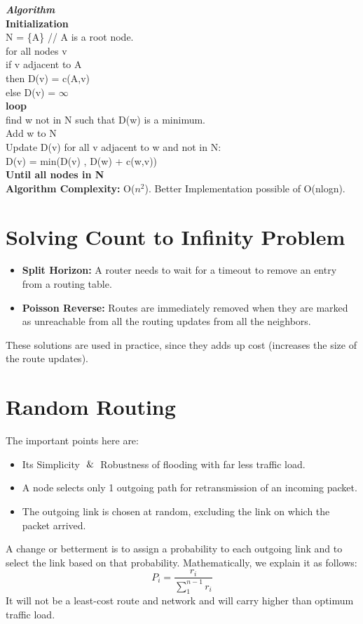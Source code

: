 \documentclass[12pt]{article}
\begin{document}
\textit{\textbf{Algorithm}} \\

\textbf{Initialization} \\
N = \{A\} // A is a root node. \\
for all nodes v \\
if v adjacent to A \\
then D(v) = c(A,v) \\
else D(v) = $\infty$ \\
\textbf{loop} \\
find w not in N such that D(w) is a minimum. \\
Add w to N \\
Update D(v) for all v adjacent to w and not in N: \\
D(v) = min(D(v) , D(w) + c(w,v)) \\
\textbf{Until all nodes in N} \\

\textbf{Algorithm Complexity:} O($n^2$). Better Implementation possible of O(nlogn).

\section{Solving Count to Infinity Problem}
\begin{itemize}
    \item \textbf{Split Horizon:} A router needs to wait for a timeout to remove an entry from a routing table.
    \item \textbf{Poisson Reverse:} Routes are immediately removed when they
are marked as unreachable from all the routing updates from all the neighbors.
\end{itemize}
These solutions are used in practice, since they adds up cost (increases the size of the route updates).

\section{Random Routing}
The important points here are:
\begin{itemize}
    \item Its Simplicity $\And$ Robustness of flooding with far less traffic load.
    \item A node selects only 1 outgoing path for retransmission of an incoming packet.
    \item The outgoing link is chosen at random, excluding the link on which the packet arrived.
\end{itemize}
A change or betterment is to assign a probability to each outgoing link and to select the link based on that probability.
Mathematically, we explain it as follows:
    \begin{equation*}
        P_{i} = \frac{r_{i}}{\sum_{1}^{n-1}r_{i}}
    \end{equation*}
It will not be a least-cost route and network and will carry higher than optimum traffic load. 
\end{document}
